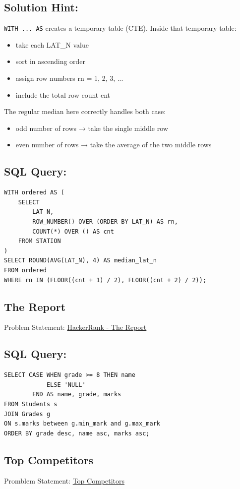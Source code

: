 \documentclass[12pt,a4paper]{article}
\begin{document}
\subsection*{Solution Hint: }
\texttt{WITH ... AS} creates a temporary table (CTE).\newline
Inside that temporary table:
\begin{itemize}
    \item take each LAT\_N value
    \item sort in ascending order
    \item assign row numbers rn = 1, 2, 3, ...
    \item include the total row count cnt
\end{itemize}
The regular median here correctly handles both case:
\begin{itemize}
    \item odd number of rows → take the single middle row
    \item even number of rows → take the average of the two middle rows
\end{itemize}
\subsection*{SQL Query: }
\begin{lstlisting}[style=sqlstyle]
WITH ordered AS (
    SELECT
        LAT_N,
        ROW_NUMBER() OVER (ORDER BY LAT_N) AS rn,
        COUNT(*) OVER () AS cnt
    FROM STATION
)
SELECT ROUND(AVG(LAT_N), 4) AS median_lat_n
FROM ordered
WHERE rn IN (FLOOR((cnt + 1) / 2), FLOOR((cnt + 2) / 2));
\end{lstlisting}
\subsection{The Report}
Problem Statement: \href{https://www.hackerrank.com/challenges/the-report/problem?isFullScreen=true}{HackerRank - The Report}
\subsection*{SQL Query: }
\begin{lstlisting}[style=sqlstyle]
SELECT CASE WHEN grade >= 8 THEN name
            ELSE 'NULL'
        END AS name, grade, marks
FROM Students s
JOIN Grades g 
ON s.marks between g.min_mark and g.max_mark
ORDER BY grade desc, name asc, marks asc;
\end{lstlisting}
\subsection{Top Competitors}
Promblem Statement: \href{https://www.hackerrank.com/challenges/full-score/problem?isFullScreen=true}{Top Competitors}
\end{document}
